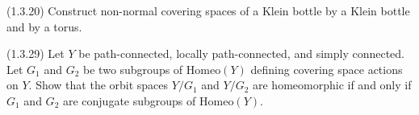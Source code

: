 \documentclass[12pt]{article}
\begin{document}
\begin{problem}{2}
    (1.3.20) Construct non-normal covering spaces of a Klein bottle by a Klein bottle and by a torus. 
\end{problem}

\begin{solution}
    
\end{solution}
\newpage

\begin{problem}{3}
    (1.3.29) Let $Y$ be path-connected, locally path-connected, and simply connected. Let $G_1$ and $G_2$ be two subgroups of $\mathrm{Homeo}(Y)$ defining covering space actions on $Y$. Show that the orbit spaces $Y/G_1$ and $Y/G_2$ are homeomorphic if and only if $G_1$ and $G_2$ are conjugate subgroups of $\mathrm{Homeo}(Y)$. 
\end{problem}
\end{document}
